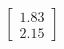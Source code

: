 \documentclass[preview]{standalone}
\begin{document}
\begin{align*}
\begin{bmatrix} 1.83 \\ 2.15 \end{bmatrix}
\end{align*}
\end{document}
